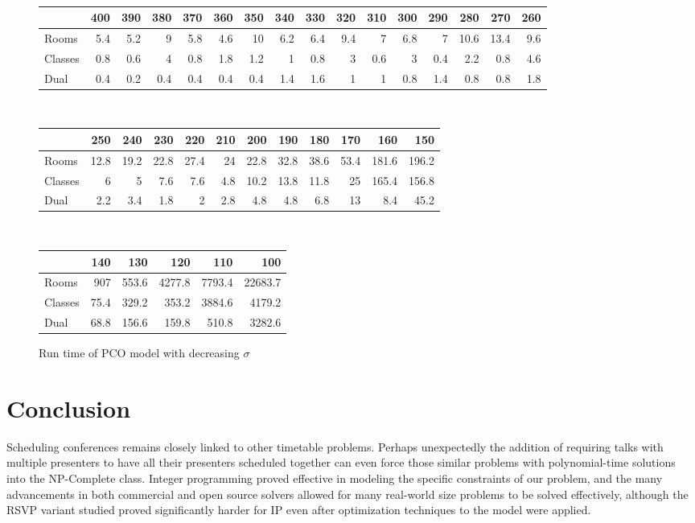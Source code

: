 \documentclass{svjour3}                     %
\begin{document}
\begin{figure}[h!]
	\caption{Run time of PCO model with decreasing $\sigma$}
	\centering
	 \\
	\begin{tabular}{| l | r | r | r | r | r | r | r | r | r | r | r | r | r | r | r |}
		\hline
		& 400 & 390	 & 380  & 370 & 360 & 350 & 340 & 330 & 320 & 310 & 300 & 290 & 280 & 270 & 260 \\
		\hline
		Rooms & 5.4 & 5.2 & 9 & 5.8 & 4.6 & 10 & 6.2 & 6.4 & 9.4 & 7 & 6.8 & 7 & 10.6 & 13.4 & 9.6 \\
		\hline
		Classes & 0.8 & 0.6 & 4 & 0.8 & 1.8 & 1.2 & 1 & 0.8 & 3 & 0.6 & 3 & 0.4 & 2.2 & 0.8 & 4.6 \\
		\hline
		Dual & 0.4 & 0.2 & 0.4 & 0.4 & 0.4 & 0.4 & 1.4 & 1.6 & 1 & 1 & 0.8 & 1.4 & 0.8 & 0.8 & 1.8 \\
		\hline
	\end{tabular} \\
	\hfill \break
	\begin{tabular}{| l | r | r | r | r | r | r | r | r | r | r | r |}
		\hline
		& 250 & 240 & 230 & 220 & 210 & 200 & 190 & 180 & 170 & 160 & 150 \\
		\hline
		Rooms & 12.8 & 19.2 & 22.8 & 27.4 & 24 & 22.8 & 32.8 & 38.6 & 53.4 & 181.6 & 196.2 \\
		\hline
		Classes & 6 & 5 & 7.6 & 7.6 & 4.8 & 10.2 & 13.8 & 11.8 & 25 & 165.4 & 156.8 \\
		\hline
		Dual & 2.2 & 3.4 & 1.8 & 2 & 2.8 & 4.8 & 4.8 & 6.8 & 13 & 8.4 & 45.2 \\
		\hline	
	\end{tabular} \\
	\hfill \break
	\begin{tabular}{| l | r | r | r | r | r |}
		\hline
		& 140 & 130 & 120 & 110 & 100 \\
		\hline
		Rooms & 907 & 553.6 & 4277.8 & 7793.4 & 22683.7 \\
		\hline
		Classes & 75.4 & 329.2 & 353.2 & 3884.6 & 4179.2 \\
		\hline
		Dual & 68.8 & 156.6 & 159.8 & 510.8 & 3282.6 \\
		\hline
	\end{tabular}
	\label{2013_normal_sigma_run_time}
\end{figure}

\section{Conclusion}
Scheduling conferences remains closely linked to other timetable problems. Perhaps unexpectedly the addition of requiring talks with multiple presenters to have all their presenters scheduled together can even force those similar problems with polynomial-time solutions into the NP-Complete class. Integer programming proved effective in modeling the specific constraints of our problem, and the many advancements in both commercial and open source solvers allowed for many real-world size problems to be solved effectively, although the RSVP variant studied proved significantly harder for IP even after optimization techniques to the model were applied.
	
\end{document}
